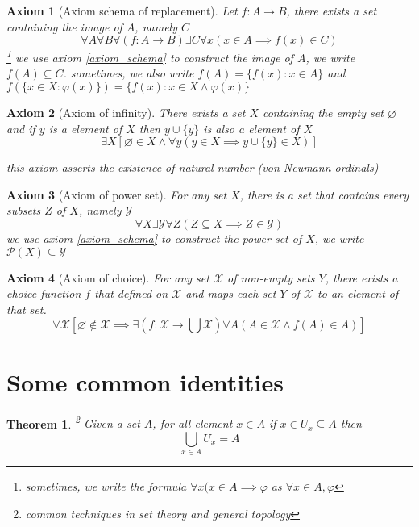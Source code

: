\documentclass{article}
\newtheorem{theorem}{Theorem}
\newtheorem{axiom}{Axiom}
\let\emptyset\varnothing
\begin{document}
\begin{axiom}[Axiom schema of replacement]
    Let $f: A \to B$, there exists a set containing the image of $A$, namely $C$
    $$
        \forall A \forall B \forall (f: A \to B) \exists C \forall x (x \in A \implies f(x) \in C)
    $$ \footnote{sometimes, we write the formula $\forall x (x \in A \implies \varphi$ as $\forall x \in A, \varphi$}
    we use axiom \ref{axiom_schema} to construct the image of $A$, we write $f(A) \subseteq C$. sometimes, we also write $f(A) = \{f(x): x \in A\}$ and $f(\{ x \in X: \varphi(x)\}) = \{f(x): x \in X \land \varphi(x) \}$
\end{axiom}

\begin{axiom}[Axiom of infinity]
    There exists a set $X$ containing the empty set $\emptyset$ and if $y$ is a element of $X$ then $y \cup \{y\}$ is also a element of $X$
    $$
    \exists X[\emptyset \in X \land \forall y (y \in X \implies y \cup \{y\} \in X)]
    $$
    
    this axiom asserts the existence of natural number (von Neumann ordinals)
\end{axiom}

\begin{axiom}[Axiom of power set]
    For any set $X$, there is a set that contains every subsets $Z$ of $X$, namely $\mathcal{Y}$
    $$
        \forall X \exists \mathcal{Y} \forall Z (Z \subseteq X \implies Z \in \mathcal{Y})
    $$
    we use axiom \ref{axiom_schema} to construct the power set of $X$, we write $\mathcal{P}(X) \subseteq \mathcal{Y}$
\end{axiom}

\begin{axiom}[Axiom of choice]
    For any set $\mathcal{X}$ of non-empty sets $Y$, there exists a choice function $f$ that defined on $\mathcal{X}$ and maps each set $Y$ of $\mathcal{X}$ to an element of that set.
    $$
    \forall \mathcal{X} [\emptyset \notin \mathcal{X} \implies \exists (f: \mathcal{X} \to \bigcup \mathcal{X}) \forall A (A \in \mathcal{X} \land f(A) \in A)]
    $$
\end{axiom}


\section{Some common identities}




\begin{theorem}\footnote{common techniques in set theory and general topology}
    \label{cover}
    Given a set $A$, for all element $x \in A$ if $x \in U_x \subseteq A$ then
    $$
        \bigcup_{x \in A} U_x = A
    $$
\end{theorem} 
\end{document}
